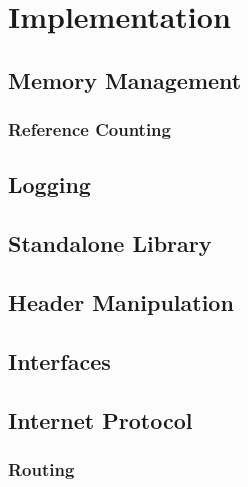 

\section{Implementation}

    \subsection{Memory Management}
        \subsubsection{Reference Counting}

    \subsection{Logging}

    \subsection{Standalone Library}

    \subsection{Header Manipulation}

    \subsection{Interfaces}\label{sec:intf}

    \subsection{Internet Protocol}

        \subsubsection{Routing}


